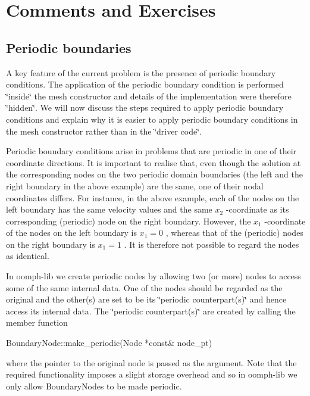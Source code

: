  

\hypertarget{index_comments}{}\section{Comments and Exercises}\label{index_comments}
\hypertarget{index_periodic}{}\subsection{Periodic boundaries}\label{index_periodic}
A key feature of the current problem is the presence of periodic boundary conditions. The application of the periodic boundary condition is performed \char`\"{}inside\char`\"{} the mesh constructor and details of the implementation were therefore \char`\"{}hidden\char`\"{}. We will now discuss the steps required to apply periodic boundary conditions and explain why it is easier to apply periodic boundary conditions in the mesh constructor rather than in the \char`\"{}driver code\char`\"{}.

Periodic boundary conditions arise in problems that are periodic in one of their coordinate directions. It is important to realise that, even though the solution at the corresponding nodes on the two periodic domain boundaries (the left and the right boundary in the above example) are the same, one of their nodal coordinates differs. For instance, in the above example, each of the nodes on the left boundary has the same velocity values and the same $ x_2$ -\/coordinate as its corresponding (periodic) node on the right boundary. However, the $ x_1 $ -\/coordinate of the nodes on the left boundary is $ x_1=0$ , whereas that of the (periodic) nodes on the right boundary is $ x_1=1$ . It is therefore not possible to regard the nodes as identical.

In {\ttfamily oomph-\/lib} we create periodic nodes by allowing two (or more) nodes to access some of the same internal data. One of the nodes should be regarded as the original and the other(s) are set to be its \char`\"{}periodic counterpart(s)\char`\"{} and hence access its internal data. The \char`\"{}periodic counterpart(s)\char`\"{} are created by calling the member function 
\begin{DoxyCode}
BoundaryNode::make\_periodic(Node *\textcolor{keyword}{const}& node\_pt)
\end{DoxyCode}
 where the pointer to the original node is passed as the argument. Note that the required functionality imposes a slight storage overhead and so in {\ttfamily oomph-\/lib} we only allow Boundary\+Nodes to be made periodic.


